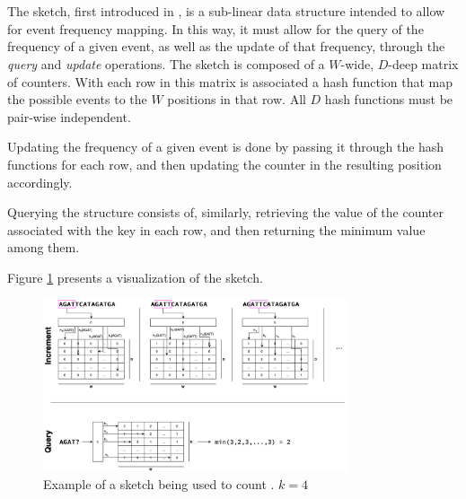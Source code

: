 \section{\cm}
\label{sec:countmin}

The \cm sketch, first introduced in \cite{Cormode2005}, is a sub-linear data structure intended to allow for event frequency mapping.
In this way, it must allow for the query of the frequency of a given event, as well as the update of that frequency, through the
\emph{query} and \emph{update} operations. The sketch is composed of a $W$-wide, $D$-deep matrix of counters. With each row in this
matrix is associated a hash function that map the possible events to the $W$ positions in that row. All $D$ hash functions
must be pair-wise independent.

Updating the frequency of a given event is done by passing it through the hash functions for each row, and then updating the counter in
the resulting position accordingly. 

Querying the structure consists of, similarly, retrieving the value of the counter associated with the key in each row, and then returning
the minimum value among them.


Figure \ref{fig:countminexample} presents a visualization of the \cm sketch.


\begin{figure}[htbp]
	\begin{center}
    \includegraphics[width=0.8\textwidth]{figures/cm-example}
	\end{center}
	\caption{Example of a \cm sketch being used to count \kmers. $k=4$}\label{fig:countminexample}
\end{figure}

